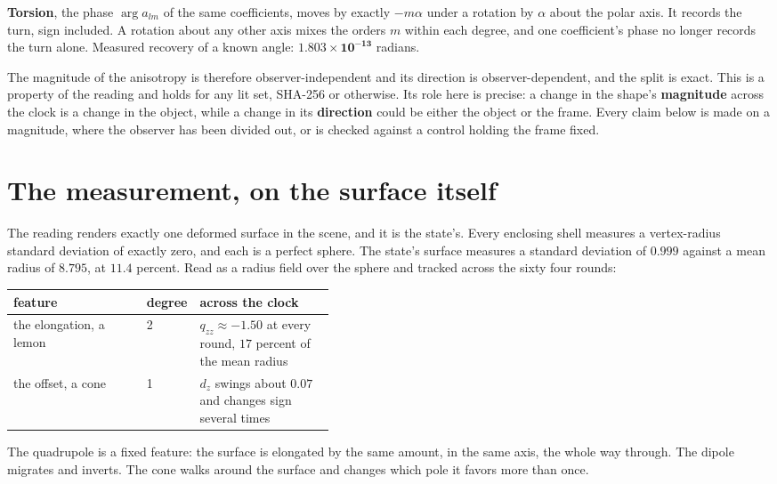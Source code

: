 \textbf{Torsion}, the phase \(\arg a_{lm}\) of the same coefficients, moves by exactly \(-m\alpha\) under a rotation by \(\alpha\) about the polar axis. It records the turn, sign included. A rotation about any other axis mixes the orders \(m\) within each degree, and one coefficient's phase no longer records the turn alone. Measured recovery of a known angle: \(\mathbf{1.803 \times 10^{-13}}\) radians.

The magnitude of the anisotropy is therefore observer-independent and its direction is observer-dependent, and the split is exact. This is a property of the reading and holds for any lit set, SHA-256 or otherwise. Its role here is precise: a change in the shape's \textbf{magnitude} across the clock is a change in the object, while a change in its \textbf{direction} could be either the object or the frame. Every claim below is made on a magnitude, where the observer has been divided out, or is checked against a control holding the frame fixed.

\section{The measurement, on the surface itself}

The reading renders exactly one deformed surface in the scene, and it is the state's. Every enclosing shell measures a vertex-radius standard deviation of exactly zero, and each is a perfect sphere. The state's surface measures a standard deviation of \(0.999\) against a mean radius of \(8.795\), at \(11.4\) percent. Read as a radius field over the sphere and tracked across the sixty four rounds:

\begin{center}
\begin{tabular}{@{}llp{0.42\linewidth}@{}}
\toprule
feature & degree & across the clock \\
\midrule
the elongation, a lemon & 2 & \(q_{zz} \approx -1.50\) at every round, \(17\) percent of the mean radius \\
the offset, a cone & 1 & \(d_z\) swings about \(0.07\) and changes sign several times \\
\bottomrule
\end{tabular}
\end{center}

The quadrupole is a fixed feature: the surface is elongated by the same amount, in the same axis, the whole way through. The dipole migrates and inverts. The cone walks around the surface and changes which pole it favors more than once.

